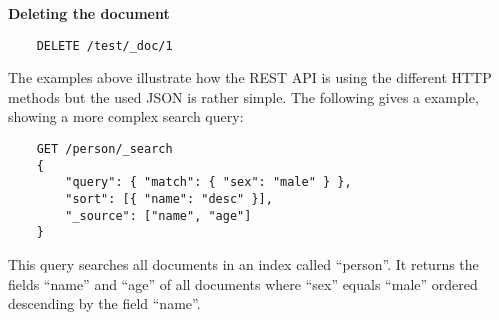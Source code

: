 \begin{minipage}[c]{0.95\textwidth}
    \textbf{Deleting the document}
    \begin{lstlisting}
    DELETE /test/_doc/1
    \end{lstlisting}
\end{minipage}

The examples above illustrate how the REST API is using the different HTTP methods but the used JSON is rather simple. The following gives a example, showing a more complex search query:

\begin{minipage}[c]{0.95\textwidth}
    \begin{lstlisting}
    GET /person/_search
    {
        "query": { "match": { "sex": "male" } },
        "sort": [{ "name": "desc" }],
        "_source": ["name", "age"]
    }
    \end{lstlisting}
\end{minipage}

This query searches all documents in an index called “person”. It returns the fields “name” and “age” of all documents where “sex” equals “male” ordered descending by the field “name”.